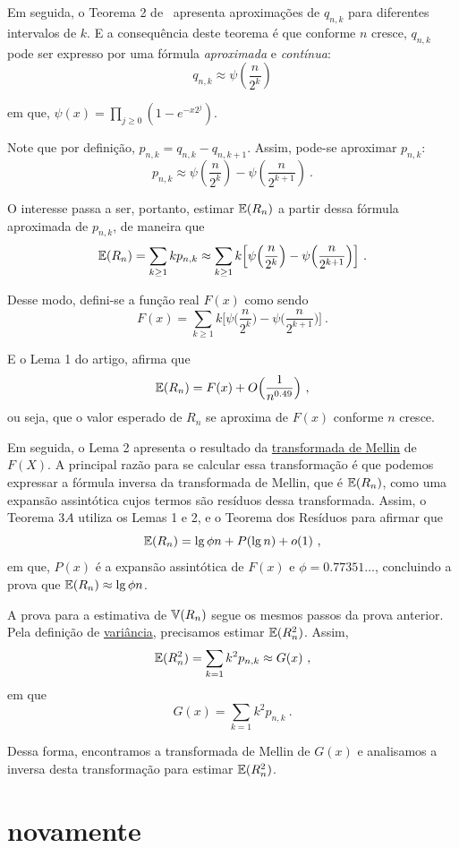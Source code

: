 Em seguida, o Teorema 2 de~\citep{flajolet:martin:85} apresenta aproximações de $q_{n,k}$ para diferentes intervalos de 
$k$. E a consequência deste teorema é  que conforme $n$ cresce, $q_{n,k}$ pode ser expresso por uma fórmula 
\textit{aproximada} e \textit{contínua}:
\[ q_{n,k} \approx \psi(\frac{n}{2^k}) \]

em que, $\psi(x) = \prod_{j \geq 0} (1 - e^{-x2^j})$.

Note que por definição, $p_{n,k} = q_{n,k} - q_{n,k+1}$. Assim, pode-se aproximar $p_{n,k}$:
\[ p_{n,k} \approx \psi(\frac{n}{2^k}) - \psi(\frac{n}{2^{k+1}}) \ . \]

O interesse passa a ser, portanto, estimar $\mathbb{E}(R_n)$ a partir dessa fórmula aproximada de $p_{n,k}$, de maneira 
que 
\[ \mathbb{E}(R_n) = \sum_{k \geq 1} k p_{n,k} \approx \sum_{k \geq 1} k \Big[ \psi \Big( \frac{n}{2^k} \Big) - \psi 
  \Big( \frac{n}{2^{k+1}} \Big) \Big] \ . \]

Desse modo, defini-se a função real $F(x)$ como sendo
\[ F(x) =  \sum_{k \geq 1} k \Big[ \psi \Big( \frac{n}{2^k} \Big) - \psi \Big( \frac{n}{2^{k+1}} \Big) \Big] \ . \]

E o Lema 1 do artigo, afirma que 
\[ \mathbb{E}(R_n) = F(x) + O \Big( \frac{1}{n^{0.49}} \Big) \ , \]
ou seja, que o valor esperado de $R_n$ se aproxima de $F(x)$ conforme $n$ cresce.

Em seguida, o Lema 2 apresenta o resultado da \hyperref[ap:mellin]{transformada de Mellin} de $F(X)$. A principal razão 
para se calcular essa transformação é que podemos expressar a fórmula inversa da transformada de Mellin, que é 
$\mathbb{E}(R_n)$, como uma expansão assintótica cujos termos são resíduos dessa transformada. Assim, o Teorema $3A$ utiliza 
os Lemas 1 e 2, e o Teorema dos Resíduos para afirmar que 
\[ \Ebb(R_n) = \lg \phi n + P(\lg n) + o(1) \ , \]
em que, $P(x)$ é a expansão assintótica de $F(x)$ e $\phi = 0.77351{\dots}$, concluindo a prova que 
$\mathbb{E}(R_n) \approx \lg \phi n$.

A prova para a estimativa de $\mathbb{V}(R_n)$ segue os mesmos passos da prova anterior. Pela definição de 
\hyperref[ap:variance]{variância}, precisamos estimar $\mathbb{E}(R_n ^ 2)$. Assim, 
\[ \mathbb{E}(R_n ^ 2) = \sum_{k=1} k^2 p_{n,k} \approx G(x) \ , \]
em que
\[ G(x) = \sum_{k=1} k^2 p_{n,k} \ . \]

Dessa forma, encontramos a transformada de Mellin de $G(x)$ e analisamos a inversa desta transformação para estimar 
$\mathbb{E}(R_n^2)$.

\section{ novamente}

